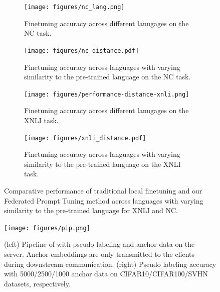 \documentclass[withindex,glossary,firstyr]{cam-thesis}
\begin{document}
\begin{figure}[h]
    \centering
    \vspace{-0.3cm}%
    \begin{subfigure}{0.49\textwidth}
        \centering
        \texttt{[image: figures/nc\_lang.png]}
        \vspace{-0.1cm}
        \caption{Finetuning accuracy across different lanugages on the NC task. }
    \end{subfigure}
    \hfill
    \begin{subfigure}{0.49\textwidth}
        \centering
        \texttt{[image: figures/nc\_distance.pdf]}
        \vspace{-0.1cm}
        \caption{Finetuning accuracy across languages with varying similarity to the pre-trained language on the NC task. }
    \end{subfigure}
    \hfill
    \begin{subfigure}{0.49\textwidth}
        \centering
        \texttt{[image: figures/performance-distance-xnli.png]}
        \vspace{-0.1cm}
        \caption{Finetuning accuracy across different lanugages on the XNLI task. }
    \end{subfigure}
    \hfill
    \begin{subfigure}{0.49\textwidth}
        \centering
        \texttt{[image: figures/xnli\_distance.pdf]}
        \vspace{-0.1cm}
        \caption{Finetuning accuracy across languages with varying similarity to the pre-trained language on the XNLI task. }
    \end{subfigure}
    \caption{Comparative performance of traditional local finetuning and our Federated Prompt Tuning method across languages with varying similarity to the pre-trained language for XNLI and NC. }
    \vspace{-0.5cm}%
    \label{fig:combined}
\end{figure}

\begin{figure}[t]
\centering
    \texttt{[image: figures/pip.png]}
\caption{\small (left) Pipeline of \method with pseudo labeling and anchor data on the server. Anchor embeddings are only transmitted to the clients during downstream communication. (right) Pseudo labeling accuracy with 5000/2500/1000 anchor data on CIFAR10/CIFAR100/SVHN datasets, respectively.}
\label{fig:pip}
\vspace{-5mm}
\end{figure}
\end{document}
